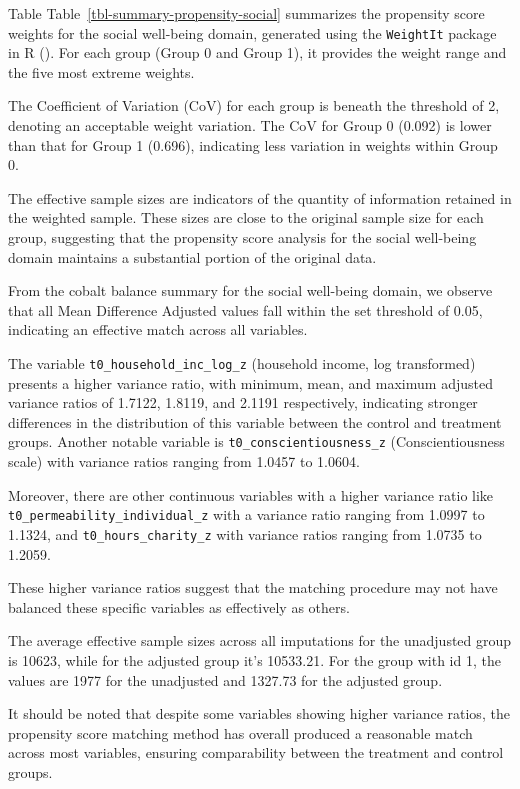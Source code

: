 \documentclass[
  singlecolumn,
  9pt]{article}
\begin{document}
Table Table~\ref{tbl-summary-propensity-social} summarizes the
propensity score weights for the social well-being domain, generated
using the \texttt{WeightIt} package in R
(). For each group
(Group 0 and Group 1), it provides the weight range and the five most
extreme weights.

The Coefficient of Variation (CoV) for each group is beneath the
threshold of 2, denoting an acceptable weight variation. The CoV for
Group 0 (0.092) is lower than that for Group 1 (0.696), indicating less
variation in weights within Group 0.

The effective sample sizes are indicators of the quantity of information
retained in the weighted sample. These sizes are close to the original
sample size for each group, suggesting that the propensity score
analysis for the social well-being domain maintains a substantial
portion of the original data.

From the cobalt balance summary for the social well-being domain, we
observe that all Mean Difference Adjusted values fall within the set
threshold of 0.05, indicating an effective match across all variables.

The variable \texttt{t0\_household\_inc\_log\_z} (household income, log
transformed) presents a higher variance ratio, with minimum, mean, and
maximum adjusted variance ratios of 1.7122, 1.8119, and 2.1191
respectively, indicating stronger differences in the distribution of
this variable between the control and treatment groups. Another notable
variable is \texttt{t0\_conscientiousness\_z} (Conscientiousness scale)
with variance ratios ranging from 1.0457 to 1.0604.

Moreover, there are other continuous variables with a higher variance
ratio like \texttt{t0\_permeability\_individual\_z} with a variance
ratio ranging from 1.0997 to 1.1324, and \texttt{t0\_hours\_charity\_z}
with variance ratios ranging from 1.0735 to 1.2059.

These higher variance ratios suggest that the matching procedure may not
have balanced these specific variables as effectively as others.

The average effective sample sizes across all imputations for the
unadjusted group is 10623, while for the adjusted group it's 10533.21.
For the group with id 1, the values are 1977 for the unadjusted and
1327.73 for the adjusted group.

It should be noted that despite some variables showing higher variance
ratios, the propensity score matching method has overall produced a
reasonable match across most variables, ensuring comparability between
the treatment and control groups.
\end{document}
